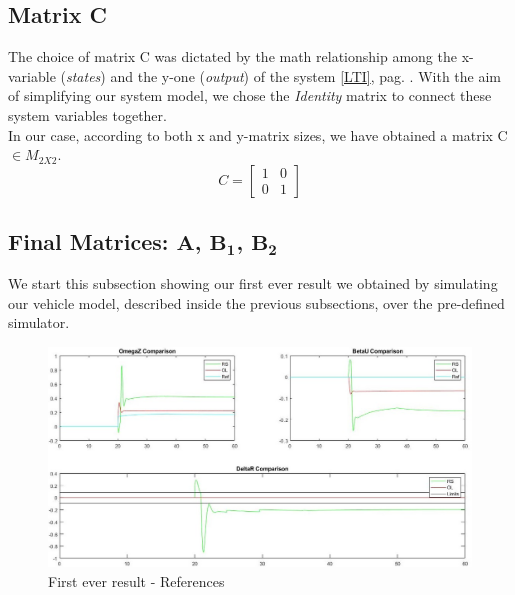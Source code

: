 \subsection{Matrix C}
	The choice of matrix C was dictated by the math relationship among the x-variable (\textit{states}) and the y-one (\textit{output}) of the system \ref{LTI}, pag. \pageref{LTI}. With the aim of simplifying our system model, we chose the \textit{Identity} matrix to connect these system variables together. \\ In our case, according to both x and y-matrix sizes, we have obtained a matrix C $\in M_{2X2}$.
		\begin{equation}
			C = 
			\begin{bmatrix}
				1 & 0 \\
				0 & 1
			\end{bmatrix}
		\end{equation}
\subsection{Final Matrices: $\mathbf{A}$, $\mathbf{B_{1}}$, $\mathbf{B_{2}}$}
We start this subsection showing our first ever result we obtained by simulating our vehicle model, described inside the previous subsections, over the pre-defined simulator. 

\begin{figure} \label{FR ref}
	\centering
	\includegraphics[scale=0.38]{../Images/LinSyst/FakeRes}
	\caption{First ever result - References}
\end{figure}

